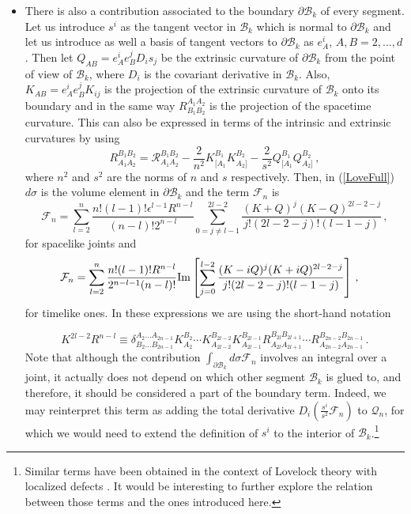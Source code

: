 \documentclass[11pt,letterpaper]{article}
\begin{document}
\begin{itemize}
\item{There is also a contribution associated to the boundary $\partial\mathcal{B}_k$ of every segment. Let us introduce $s^i$ as the tangent vector in $\mathcal{B}_k$ which is normal to $\partial\mathcal{B}_k$ and let us introduce as well a basis of tangent vectors to $\partial\mathcal{B}_k$ as $e_A^i$, $A, B= 2,...,d$. Then let $Q_{AB}=e_{A}^ie_{B}^jD_i s_j$ be the extrinsic curvature of $\partial\mathcal{B}_k$ from the point of view of $\mathcal{B}_k$, where $D_i$ is the covariant derivative in $\mathcal{B}_k$. Also, $K_{AB}=e_{A}^i e_{B}^jK_{ij}$ is the projection of the extrinsic curvature of $\mathcal{B}_k$ onto its boundary and in the same way $R^{A_1A_2}_{B_1B_2}$ is the projection of the spacetime curvature. This can also be expressed in terms of the intrinsic and extrinsic curvatures by using 
\begin{equation}
R^{B_1B_2}_{A_1A_2}=\mathcal{R}^{B_1B_2}_{A_1A_2}-\frac{2}{n^2} K^{B_1}_{[A_1}K^{B_2}_{A_2]}-\frac{2}{s^2} Q^{B_1}_{[A_1}Q^{B_2}_{A_2]}\, ,
\end{equation}
where $n^2$ and $s^2$ are the norms of $n$ and $s$ respectively.
Then, in (\ref{LoveFull}) $d\sigma$ is the volume element in $\partial\mathcal{B}_k$ and the term $\mathcal{F}_n$ is
\begin{equation}
\mathcal{F}_n= \sum_{l=2}^{n}\frac{n!(l-1)! \epsilon^{l-1}R^{n-l}}{(n-l)!2^{n-l}}\sum_{0=j\neq l-1}^{2l-2}\frac{(K+Q)^j(K-Q)^{2l-2-j}}{j!(2l-2-j)!(l-1-j)}\, ,
\end{equation}
for spacelike joints and
\begin{equation}
\begin{aligned}
\mathcal{F}_n&=\sum_{l=2}^{n}\frac{n!(l-1)! R^{n-l}}{2^{n-l-1}(n-l)!}{\rm Im}\left[\sum_{j=0}^{l-2}\frac{(K-i Q)^j(K+i Q)^{2l-2-j}}{j!(2l-2-j)!(l-1-j)}\right]\, ,
\end{aligned}
\end{equation}
for timelike ones. In these expressions we are using the short-hand notation

\begin{equation}
K^{2l-2}R^{n-l}\equiv \delta^{A_2 \dots A_{2n-1}}_{B_2\dots B_{2n-1}}K^{B_2}_{A_2}\cdots K^{B_{2l-2}}_{A_{2l-2}}K^{B_{2l-1}}_{A_{2l-1}}R^{B_{2l} B_{2l+1}}_{A_{2l}A_{2l+1}}\cdots R^{B_{2n-2}B_{2n-1}}_{A_{2n-2}A_{2n-1}}\, .
\end{equation}
Note that although the contribution $\int_{\partial\mathcal{B}_k}d\sigma \mathcal{F}_{n}$ involves an integral over a joint, it actually does not depend on which other segment $\mathcal{B}_k$ is glued to, and therefore, it should be considered a part of the boundary term. Indeed, we may reinterpret this term as adding the total derivative $D_i\left(\frac{s^i}{s^2}\mathcal{F}_n\right)$ to $\mathcal{Q}_n$, for which we would need to extend the definition of $s^i$ to the interior of $\mathcal{B}_k$.\footnote{Similar terms have been obtained in the context of Lovelock theory with localized defects \cite{Gravanis:2003aq,Gravanis:2004kx,Charmousis:2005ey}. It would be interesting to further explore the relation between those terms and the ones introduced here.}}


\end{itemize}
\end{document}
